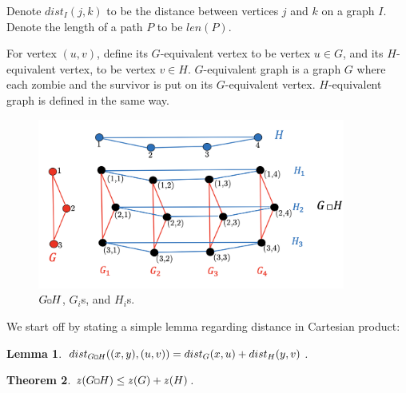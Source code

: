 \documentclass[1p]{elsarticle}
\newtheorem{theorem}{Theorem}
\newtheorem{lemma}[theorem]{Lemma}
\newcommand{\zn}{\ooalign{$z$\cr\hfil\rule[.5ex]{.2em}{.08ex}\hfil\cr}}
\newcommand{\sq}[1][black]{%
\begin{tikzpicture}                                                           
  \draw[#1] (2pt,0pt) -- (6pt,0pt);   
  \draw[#1] (2pt,0pt) -- (2pt,4pt);    
  \draw[#1] (2pt,4pt) -- (6pt,4pt);   
  \draw[#1] (6pt,0pt) -- (6pt,4pt);
\end{tikzpicture}%
}
\newcommand{\sqSmall}[1][black]{%
\begin{tikzpicture}                                                           
  \draw[#1] (1.5pt,0pt) -- (4.5pt,0pt);   
  \draw[#1] (1.5pt,0pt) -- (1.5pt,3pt);    
  \draw[#1] (1.5pt,3pt) -- (4.5pt,3pt);   
  \draw[#1] (4.5pt,0pt) -- (4.5pt,3pt);
\end{tikzpicture}%
}
\begin{document}
Denote $dist_I(j,k)$ to be the distance between vertices $j$ and $k$ on a graph $I$. Denote the length of a path $P$ to be $len(P)$. 

For vertex $(u,v)$, define its $G$-equivalent vertex to be vertex $u \in G$, and its $H$-equivalent vertex, to be vertex
$v \in H$. $G$-equivalent graph is a graph $G$ where each zombie and the survivor is put on its $G$-equivalent vertex.
$H$-equivalent graph is defined in the same way.


\begin{figure}[h!]
	
	\centering
	\includegraphics[width=0.9\textwidth]{cp3.png}
	\caption{$G \sqSmall H$, $G_i$s, and $H_i$s.}
	\label{fig:p1}
\end{figure}


We start off by stating a simple lemma regarding distance in Cartesian product:
\begin{lemma} \label{shortestpathlemma}
	$dist_{G \sqSmall H}((x,y),(u,v)) = dist_G(x,u) + dist_H(y,v)$.
\end{lemma}


\begin{theorem}
	\label{T2}
	$\zn(G \sq H) \leq \zn(G) + \zn(H)$.
\end{theorem}
\end{document}
